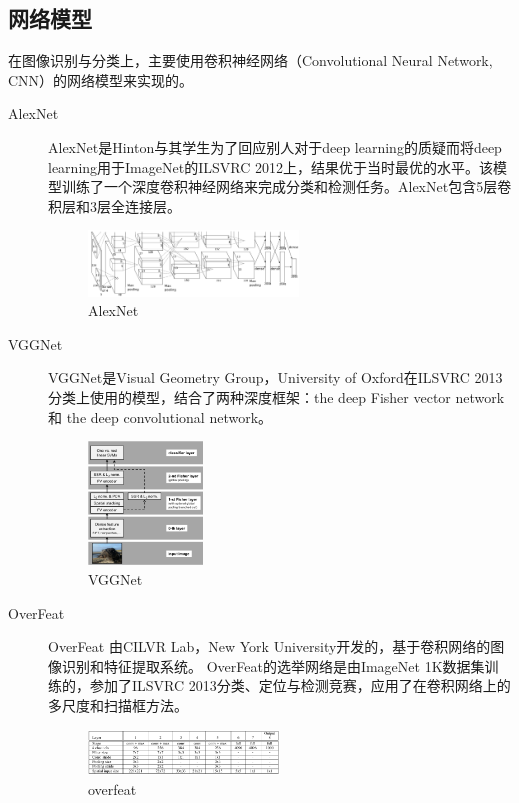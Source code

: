 \documentclass[12pt]{article}
\begin{document}
\subsection{网络模型}
在图像识别与分类上，主要使用卷积神经网络（Convolutional Neural Network, CNN）的网络模型来实现的。
\begin{description}
\item [AlexNet] AlexNet\cite{krizhevsky2012imagenet}是Hinton与其学生为了回应别人对于deep learning的质疑而将deep learning用于ImageNet的ILSVRC 2012上，结果优于当时最优的水平。该模型训练了一个深度卷积神经网络来完成分类和检测任务。AlexNet包含5层卷积层和3层全连接层。
\begin{figure}[!ht]
\centering
\includegraphics[width=0.55\textwidth]{AlexNet}
\caption{AlexNet}
\end{figure}

\item[VGGNet] VGGNet\cite{simonyan2013deep}是Visual Geometry Group，University of Oxford在ILSVRC 2013分类上使用的模型，结合了两种深度框架：the deep Fisher vector network 和 the deep convolutional network。
\begin{figure}[!ht]
\centering
\includegraphics[width=0.3\textwidth]{vggnet1}
\caption{VGGNet}
\end{figure}

\item[OverFeat] OverFeat\cite{sermanet2013overfeat}%
由CILVR Lab，New York University开发的，基于卷积网络的图像识别和特征提取系统。
OverFeat的选举网络是由ImageNet 1K数据集训练的，参加了ILSVRC 2013分类、定位与检测竞赛，应用了在卷积网络上的多尺度和扫描框方法。
\begin{figure}[!ht]
\centering
\includegraphics[width=0.5\textwidth]{overfeat}
\caption{overfeat}
\end{figure}


\end{description}
\end{document}
